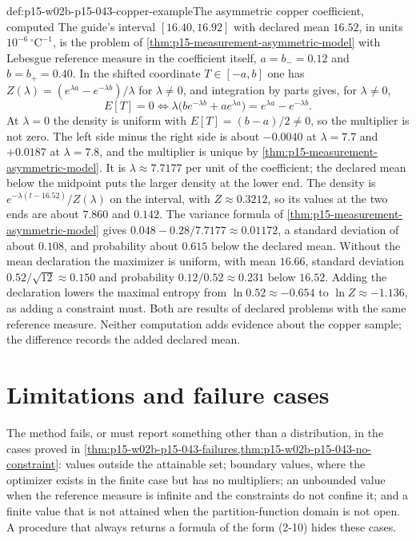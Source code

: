 \begin{hbexample}{def:p15-w02b-p15-043-copper-example}{The asymmetric copper coefficient, computed}
The guide's interval \([16.40,16.92]\) with declared mean \(16.52\), in units
\(10^{-6}\,{}^\circ\mathrm C^{-1}\), is the problem of
\cref{thm:p15-measurement-asymmetric-model} with Lebesgue reference measure in
the coefficient itself, \(a=b_-=0.12\) and \(b=b_+=0.40\). In the shifted
coordinate \(T\in[-a,b]\) one has
\(Z(\lambda)=(e^{\lambda a}-e^{-\lambda b})/\lambda\) for \(\lambda\neq0\), and
integration by parts gives, for \(\lambda\neq0\),
\[
 E[T]=0\iff \lambda\bigl(be^{-\lambda b}+ae^{\lambda a}\bigr)=e^{\lambda a}-e^{-\lambda b}.
\]
At \(\lambda=0\) the density is uniform with \(E[T]=(b-a)/2\neq0\), so the
multiplier is not zero. The left side minus the right side is about
\(-0.0040\) at \(\lambda=7.7\) and \(+0.0187\) at \(\lambda=7.8\), and the
multiplier is unique by \cref{thm:p15-measurement-asymmetric-model}. It is \(\lambda\approx7.7177\) per unit of
the coefficient; the declared mean below the midpoint puts the larger density at
the lower end. The density is \(e^{-\lambda(t-16.52)}/Z(\lambda)\) on the
interval, with \(Z\approx0.3212\), so its values at the two ends are about
\(7.860\) and \(0.142\). The variance formula of
\cref{thm:p15-measurement-asymmetric-model} gives
\(0.048-0.28/7.7177\approx0.01172\), a standard deviation of about \(0.108\),
and probability about \(0.615\) below the declared mean.
Without the mean declaration the maximizer is uniform, with mean \(16.66\),
standard deviation \(0.52/\sqrt{12}\approx0.150\) and probability
\(0.12/0.52\approx0.231\) below \(16.52\). Adding the declaration lowers the
maximal entropy from \(\ln0.52\approx-0.654\) to
\(\ln Z\approx-1.136\), as adding a constraint must. Both are results of
declared problems with the same reference measure. Neither computation adds
evidence about the copper sample; the difference records the added declared
mean.
\end{hbexample}

\section{Limitations and failure cases}
\label{sec:p15-w02b-p15-043-limits}

The method fails, or must report something other than a distribution, in the
cases proved in \cref{thm:p15-w02b-p15-043-failures,thm:p15-w02b-p15-043-no-constraint}:
values outside the attainable set; boundary values, where the optimizer
exists in the finite case but has no multipliers; an unbounded value when the
reference measure is infinite and the constraints do not confine it; and a
finite value that is not attained when the partition-function domain is not
open. A procedure that always returns a formula of the form (2-10) hides
these cases.

